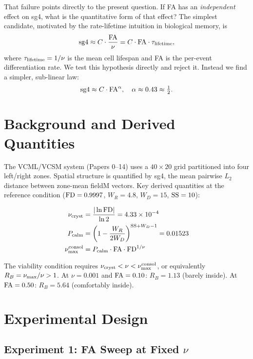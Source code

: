 \documentclass[11pt]{article}
\begin{document}
That failure points directly to the present question.
If FA has an \emph{independent} effect on sg4, what is the quantitative form
of that effect?
The simplest candidate, motivated by the rate-lifetime intuition in biological
memory, is
\begin{equation}
{\rm sg4} \approx C \cdot \frac{{\rm FA}}{\nu}
= C \cdot {\rm FA} \cdot \tau_{\rm lifetime},
\label{eq:rate_lifetime}
\end{equation}
where $\tau_{\rm lifetime} = 1/\nu$ is the mean cell lifespan and FA is the
per-event differentiation rate.
We test this hypothesis directly and reject it.
Instead we find a simpler, sub-linear law:
\begin{equation}
{\rm sg4} \approx C \cdot {\rm FA}^{\alpha}, \quad \alpha \approx 0.43 \approx
\tfrac{1}{2}.
\label{eq:sqrt_law}
\end{equation}

\section{Background and Derived Quantities}

The VCML/VCSM system (Papers 0--14) uses a $40 \times 20$ grid partitioned
into four left/right zones.
Spatial structure is quantified by sg4, the mean pairwise $L_2$ distance
between zone-mean fieldM vectors.
Key derived quantities at the reference condition (${\rm FD}=0.9997$,
$W_R=4.8$, $W_D=15$, ${\rm SS}=10$):

\begin{align}
\nu_{\rm cryst} &= \frac{|\ln{\rm FD}|}{\ln 2} = 4.33 \times 10^{-4} \\
P_{\rm calm} &= \left(1 - \frac{W_R}{2W_D}\right)^{{\rm SS}+W_D-1}
= 0.01523 \\
\nu_{\rm max}^{\rm consol} &= P_{\rm calm} \cdot {\rm FA} \cdot
{\rm FD}^{1/\nu}
\end{align}

The viability condition requires $\nu_{\rm cryst} < \nu < \nu_{\rm max}^{\rm consol}$,
or equivalently $R_B = \nu_{\rm max}/\nu > 1$.
At $\nu = 0.001$ and ${\rm FA} = 0.10$: $R_B = 1.13$ (barely inside).
At ${\rm FA} = 0.50$: $R_B = 5.64$ (comfortably inside).

\section{Experimental Design}

\subsection{Experiment 1: FA Sweep at Fixed $\nu$}
\end{document}
